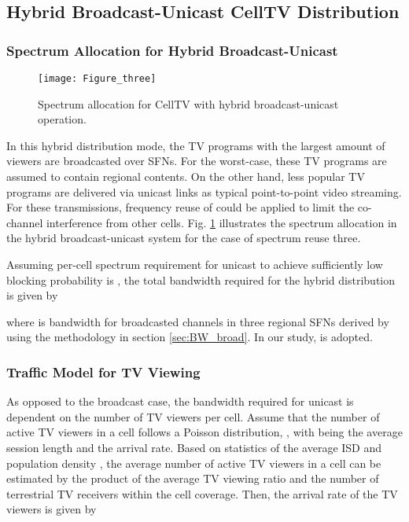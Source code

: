 \documentclass[journal]{IEEEtran}
\begin{document}
		
\subsection{Hybrid Broadcast-Unicast CellTV Distribution	}
\subsubsection{\textbf{Spectrum Allocation for Hybrid Broadcast-Unicast}}
\begin{figure}[t]
  \centering
  \texttt{[image: Figure\_three]}\\
  \caption{Spectrum allocation for CellTV with hybrid broadcast-unicast operation.}\label{fig:unicast_diag}
\end{figure}
In this hybrid distribution mode, the TV programs with the largest amount of viewers are broadcasted over SFNs. For the worst-case, these TV programs are assumed to contain regional contents. On the other hand, less popular TV programs are delivered via unicast links as typical point-to-point video streaming. For these transmissions, frequency reuse of  could be applied to limit the co-channel interference from other cells. Fig. \ref{fig:unicast_diag} illustrates the spectrum allocation in the hybrid broadcast-unicast system for the case of spectrum reuse three.

Assuming per-cell spectrum requirement for unicast to achieve sufficiently low blocking probability is , the total bandwidth required for the hybrid distribution is given by

where  is bandwidth for broadcasted channels in three regional SFNs derived by using the methodology in section \ref{sec:BW_broad}. In our study,  is adopted.




\subsubsection{\textbf{Traffic Model for TV Viewing}}
As opposed to the broadcast case, the bandwidth required for unicast is dependent on the number of TV viewers per cell. Assume that the number of active TV viewers in a cell follows a Poisson distribution, , with  being the average session length and  the arrival rate. Based on statistics of the average ISD and population density \cite{PTS2}\cite{PTS3}, the average number of active TV viewers in a cell  can be estimated by the product of the average TV viewing ratio and the number of terrestrial TV receivers within the cell coverage. Then, the arrival rate of the TV viewers is given by
\end{document}

